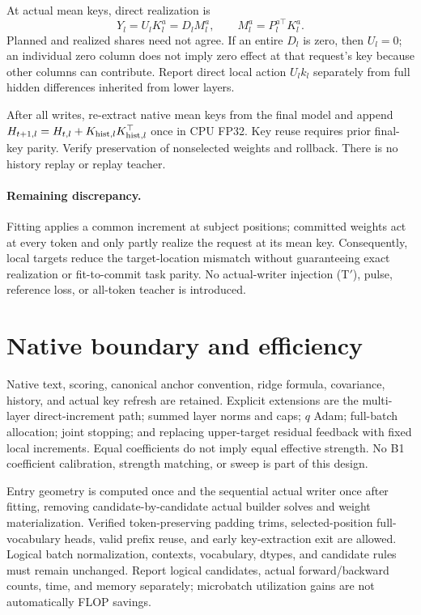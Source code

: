 \documentclass[11pt]{article}
\begin{document}
At actual mean keys, direct realization is
\begin{equation}
 Y_l=U_lK_l^a=D_lM_l^a,\qquad M_l^a=P_l^{a\top}K_l^a.
\end{equation}
Planned and realized shares need not agree. If an entire $D_l$ is zero, then
$U_l=0$; an individual zero column does not imply zero effect at that request's
key because other columns can contribute. Report direct local action $U_lk_l$
separately from full hidden differences inherited from lower layers.

After all writes, re-extract native mean keys from the final model and append
$H_{t+1,l}=H_{t,l}+K_{{\rm hist},l}K_{{\rm hist},l}^{\top}$ once in CPU FP32.
Key reuse requires prior final-key parity. Verify preservation of nonselected
weights and rollback. There is no history replay or replay teacher.

\paragraph{Remaining discrepancy.}
Fitting applies a common increment at subject positions; committed weights act
at every token and only partly realize the request at its mean key. Consequently,
local targets reduce the target-location mismatch without guaranteeing exact
realization or fit-to-commit task parity. No actual-writer injection (T$'$),
pulse, reference loss, or all-token teacher is introduced.

\section{Native boundary and efficiency}
Native text, scoring, canonical anchor convention, ridge formula, covariance,
history, and actual key refresh are retained. Explicit extensions are the
multi-layer direct-increment path; summed layer norms and caps; $q$ Adam;
full-batch allocation; joint stopping; and replacing upper-target residual
feedback with fixed local increments. Equal coefficients do not imply equal
effective strength. No B1 coefficient calibration, strength matching, or sweep
is part of this design.

Entry geometry is computed once and the sequential actual writer once after
fitting, removing candidate-by-candidate actual builder solves and weight
materialization. Verified token-preserving padding trims, selected-position
full-vocabulary heads, valid prefix reuse, and early key-extraction exit are
allowed. Logical batch normalization, contexts, vocabulary, dtypes, and candidate
rules must remain unchanged. Report logical candidates, actual forward/backward
counts, time, and memory separately; microbatch utilization gains are not
automatically FLOP savings.
\end{document}
